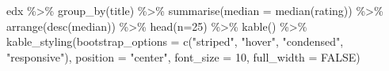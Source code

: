 \documentclass[
]{article}
\newenvironment{Shaded}{}{}
\newcommand{\AttributeTok}[1]{\textcolor[rgb]{0.49,0.56,0.16}{#1}}
\newcommand{\ConstantTok}[1]{\textcolor[rgb]{0.53,0.00,0.00}{#1}}
\newcommand{\DecValTok}[1]{\textcolor[rgb]{0.25,0.63,0.44}{#1}}
\newcommand{\FunctionTok}[1]{\textcolor[rgb]{0.02,0.16,0.49}{#1}}
\newcommand{\NormalTok}[1]{#1}
\newcommand{\SpecialCharTok}[1]{\textcolor[rgb]{0.25,0.44,0.63}{#1}}
\newcommand{\StringTok}[1]{\textcolor[rgb]{0.25,0.44,0.63}{#1}}
\begin{document}
\begin{Shaded}
\begin{Highlighting}[]
\NormalTok{edx }\SpecialCharTok{\%\textgreater{}\%}
   \FunctionTok{group\_by}\NormalTok{(title) }\SpecialCharTok{\%\textgreater{}\%}
   \FunctionTok{summarise}\NormalTok{(}\AttributeTok{median =} \FunctionTok{median}\NormalTok{(rating)) }\SpecialCharTok{\%\textgreater{}\%}
   \FunctionTok{arrange}\NormalTok{(}\FunctionTok{desc}\NormalTok{(median)) }\SpecialCharTok{\%\textgreater{}\%}
   \FunctionTok{head}\NormalTok{(}\AttributeTok{n=}\DecValTok{25}\NormalTok{) }\SpecialCharTok{\%\textgreater{}\%}
   \FunctionTok{kable}\NormalTok{() }\SpecialCharTok{\%\textgreater{}\%}
   \FunctionTok{kable\_styling}\NormalTok{(}\AttributeTok{bootstrap\_options =} \FunctionTok{c}\NormalTok{(}\StringTok{"striped"}\NormalTok{, }\StringTok{"hover"}\NormalTok{, }\StringTok{"condensed"}\NormalTok{, }\StringTok{"responsive"}\NormalTok{),}
                 \AttributeTok{position =} \StringTok{"center"}\NormalTok{,}
                 \AttributeTok{font\_size =} \DecValTok{10}\NormalTok{,}
                 \AttributeTok{full\_width =} \ConstantTok{FALSE}\NormalTok{)}
\end{Highlighting}
\end{Shaded}
\end{document}
